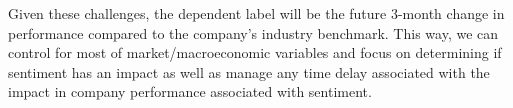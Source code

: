 \documentclass[conference, letterpaper]{IEEEtran}
\begin{document}
Given these challenges, the dependent label will be the future 3-month change in performance compared to the company's industry benchmark.
This way, we can control for most of market/macroeconomic variables and focus on determining if sentiment has an impact as well as manage any time delay associated with the impact in company performance associated with sentiment.





%
%


%
\end{document}
